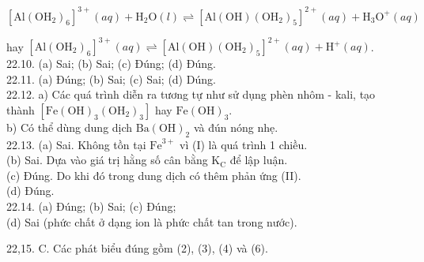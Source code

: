 \documentclass[10pt]{article}
\begin{document}
$$
\left[\mathrm{Al}\left(\mathrm{OH}_{2}\right)_{6}\right]^{3+}(a q)+\mathrm{H}_{2} \mathrm{O}(l) \rightleftharpoons\left[\mathrm{Al}(\mathrm{OH})\left(\mathrm{OH}_{2}\right)_{5}\right]^{2+}(a q)+\mathrm{H}_{3} \mathrm{O}^{+}(a q)
$$

hay $\left[\mathrm{Al}\left(\mathrm{OH}_{2}\right)_{6}\right]^{3+}(a q) \rightleftharpoons\left[\mathrm{Al}(\mathrm{OH})\left(\mathrm{OH}_{2}\right)_{5}\right]^{2+}(a q)+\mathrm{H}^{+}(a q)$.\\
22.10. (a) Sai; (b) Sai; (c) Đúng; (d) Đúng.\\
22.11. (a) Đúng; (b) Sai; (c) Sai; (d) Dúng.\\
22.12. a) Các quá trình diễn ra tương tự như sử dụng phèn nhôm - kali, tạo thành $\left[\mathrm{Fe}(\mathrm{OH})_{3}\left(\mathrm{OH}_{2}\right)_{3}\right]$ hay $\mathrm{Fe}(\mathrm{OH})_{3}$.\\
b) Có thể dùng dung dịch $\mathrm{Ba}(\mathrm{OH})_{2}$ và đún nóng nhẹ.\\
22.13. (a) Sai. Không tồn tại $\mathrm{Fe}^{3+}$ vì (I) là quá trình 1 chiều.\\
(b) Sai. Dựa vào giá trị hằng số cân bằng $\mathrm{K}_{\mathrm{C}}$ để lập luận.\\
(c) Đúng. Do khi đó trong dung dịch có thêm phản ứng (II).\\
(d) Đúng.\\
22.14. (a) Đúng; (b) Sai; (c) Đúng;\\
(d) Sai (phức chất ở dạng ion là phức chất tan trong nước).

22,15. C. Các phát biểu đúng gồm (2), (3), (4) và (6).
\end{document}
